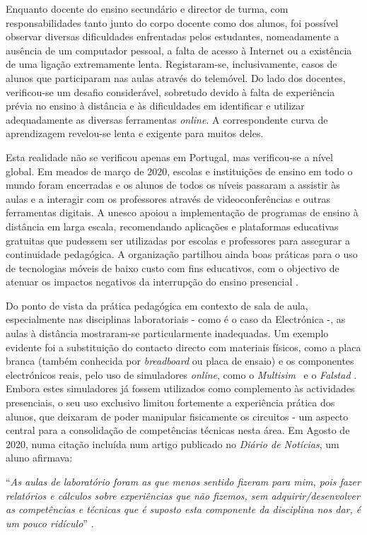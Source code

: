 Enquanto docente do ensino secundário e director de turma, com responsabilidades tanto junto do corpo docente como dos alunos, foi possível observar diversas dificuldades enfrentadas pelos estudantes, nomeadamente a ausência de um computador pessoal, a falta de acesso à Internet ou a existência de uma ligação extremamente lenta. Registaram-se, inclusivamente, casos de alunos que participaram nas aulas através do telemóvel. Do lado dos docentes, verificou-se um desafio considerável, sobretudo devido à falta de experiência prévia no ensino à distância e às dificuldades em identificar e utilizar adequadamente as diversas ferramentas \textit{online}. A correspondente curva de aprendizagem revelou-se lenta e exigente para muitos deles.

Esta realidade não se verificou apenas em Portugal, mas verificou-se a nível global. Em meados de março de 2020, escolas e instituições de ensino em todo o mundo foram encerradas e os alunos de todos os níveis passaram a assistir às aulas e a interagir com os professores através de videoconferências e outras ferramentas digitais. A \acrfull{unesco} apoiou a implementação de programas de ensino à distância em larga escala, recomendando aplicações e plataformas educativas gratuitas que pudessem ser utilizadas por escolas e professores para assegurar a continuidade pedagógica. A organização partilhou ainda boas práticas para o uso de tecnologias móveis de baixo custo com fins educativos, com o objectivo de atenuar os impactos negativos da interrupção do ensino presencial \cite{unesco}.

Do ponto de vista da prática pedagógica em contexto de sala de aula, especialmente nas disciplinas laboratoriais - como é o caso da Electrónica -, as aulas à distância mostraram-se particularmente inadequadas. Um exemplo evidente foi a substituição do contacto directo com materiais físicos, como a placa branca (também conhecida por \textit{breadboard} ou placa de ensaio) e os componentes electrónicos reais, pelo uso de simuladores \textit{online}, como o \textit{Multisim}~\cite{multisim} e o \textit{Falstad} \cite{falstad}. Embora estes simuladores já fossem utilizados como complemento às actividades presenciais, o seu uso exclusivo limitou fortemente a experiência prática dos alunos, que deixaram de poder manipular fisicamente os circuitos - um aspecto central para a consolidação de competências técnicas nesta área. Em Agosto de 2020, numa citação incluída num artigo publicado no \textit{Diário de Notícias}, um aluno afirmava:
\begin{center}
    ``\textit{As aulas de laboratório foram as que menos sentido fizeram para mim, pois fazer relatórios e cálculos sobre experiências que não fizemos, sem adquirir/desenvolver as competências e técnicas que é suposto esta componente da disciplina nos dar, é um pouco ridículo}'' \cite{impactonegativocovid}.
\end{center}

